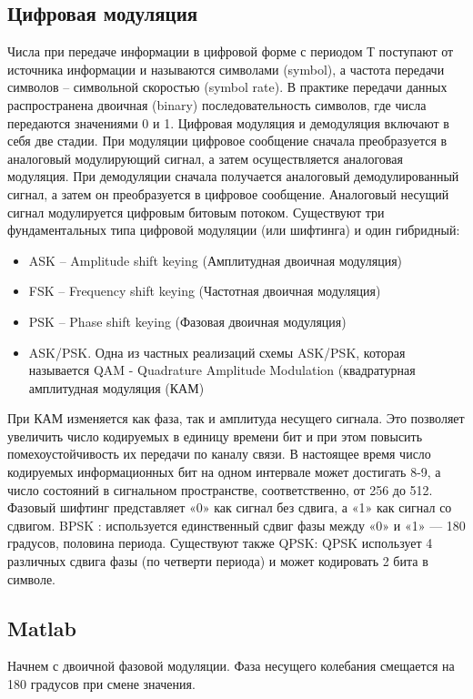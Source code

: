 \documentclass[a4paper,14pt]{extarticle}
\begin{document}
\subsection{Цифровая модуляция}
Числа при передаче информации в цифровой форме с периодом Т поступают от источника информации и называются символами (symbol), а частота передачи символов – символьной скоростью (symbol rate). В практике передачи данных распространена двоичная (binary) последовательность символов, где числа передаются значениями 0 и 1. Цифровая модуляция и демодуляция включают в себя две стадии. 
При модуляции цифровое сообщение сначала преобразуется в аналоговый модулирующий сигнал, а затем осуществляется аналоговая модуляция. При демодуляции сначала получается аналоговый демодулированный сигнал, а затем он преобразуется в цифровое сообщение. Аналоговый несущий сигнал модулируется цифровым битовым потоком. 
Существуют три фундаментальных типа цифровой модуляции (или шифтинга) и один гибридный: 
\begin{itemize}
\item ASK – Amplitude shift keying (Амплитудная двоичная модуляция)
\item FSK – Frequency shift keying (Частотная двоичная модуляция)
\item PSK – Phase shift keying (Фазовая двоичная модуляция)
\item ASK/PSK. Одна из частных реализаций схемы ASK/PSK, которая называется QAM - Quadrature Amplitude Modulation (квадратурная амплитудная модуляция (КАМ)
\end{itemize}
При КАМ изменяется как фаза, так и амплитуда несущего сигнала. Это позволяет увеличить число кодируемых в единицу времени бит и при этом повысить помехоустойчивость их передачи по каналу связи. В настоящее время число кодируемых информационных бит на одном интервале может достигать 8-9, а число  состояний в сигнальном пространстве, соответственно, от 256 до 512. Фазовый шифтинг представляет «0» как сигнал без сдвига, а «1» как сигнал со сдвигом. BPSK : используется единственный сдвиг фазы между «0» и «1» — 180 градусов, половина периода. Существуют также QPSK: QPSK использует 4 различных сдвига фазы (по четверти периода) и может кодировать 2 бита в символе. 

\subsection{Matlab}

Начнем с двоичной фазовой модуляции. Фаза несущего колебания смещается на 180 градусов при смене значения.
\end{document}
